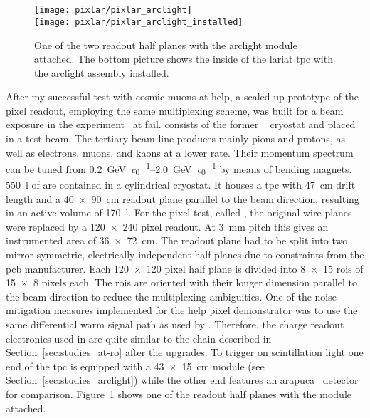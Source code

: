 \section{\pixlar{}}
\label{sec:ac_pixlar}

\begin{figure}[tbp]
	\centering
	\texttt{[image: pixlar/pixlar\_arclight]}\\
	\texttt{[image: pixlar/pixlar\_arclight\_installed]}
	\caption[\pixlar{} half plane with attached  module]{%
		One of the two \pixlar{} readout half planes with the \acrshort{arclight} module attached.
		The bottom picture shows the inside of the \acrshort{lariat} \acrshort{tpc} with the \pixlar{} \acrshort{arclight} assembly installed.
	}
	\label{fig:pixlar_arclight}
\end{figure}

After my successful test with cosmic muons at \gls{help}, a scaled-up prototype of the pixel readout, employing the same multiplexing scheme, was built for a beam exposure in the \lariat{} experiment~\cite{lariat} at \gls{fail}.
\lariat{} consists of the former \argoneut{}~\cite{argoneut} cryostat and \lartpc{} placed in a test beam.
The tertiary beam line produces mainly pions and protons, as well as electrons, muons, and kaons at a lower rate.
Their momentum spectrum can be tuned from \SIrange{0.2}{2.0}{\giga\electronvolt\per\clight} by means of bending magnets.
\SI{550}{\litre} of \lar{} are contained in a cylindrical cryostat.
It houses a \gls{tpc} with \SI{47}{\centi\metre} drift length and a \SI{40 x 90}{\centi\metre} readout plane parallel to the beam direction, resulting in an active volume of \SI{170}{\litre}.
For the pixel test, called \pixlar{}, the original wire planes were replaced by a \num{120 x 240} pixel readout.
At \SI{3}{\milli\metre} pitch this gives an instrumented area of \SI{36 x 72}{\centi\metre}.
The readout plane had to be split into two mirror-symmetric, electrically independent half planes due to constraints from the \gls{pcb} manufacturer.
Each \num{120 x 120} pixel half plane is divided into \num{8 x 15} \glspl{roi} of \num{15 x 8} pixels each.
The \glspl{roi} are oriented with their longer dimension parallel to the beam direction to reduce the multiplexing ambiguities.
One of the noise mitigation measures implemented for the \gls{help} pixel demonstrator was to use the same differential warm signal path as used by \lariat{}.
Therefore, the charge readout electronics used in \pixlar{} are quite similar to the \AT{} chain described in Section~\ref{sec:studies_at-ro} after the upgrades.
To trigger on scintillation light one end of the \gls{tpc} is equipped with a \SI{43 x 15}{\centi\metre} \AL{} module (see Section~\ref{sec:studies_arclight}) while the other end features an \gls{arapuca}~\cite{arapuca} detector for comparison.
Figure~\ref{fig:pixlar_arclight} shows one of the readout half planes with the \AL{} module attached.

